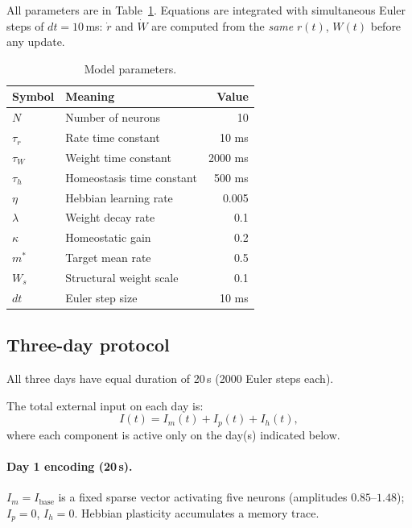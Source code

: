 \documentclass[11pt,a4paper]{article}
\begin{document}
All parameters are in Table~\ref{tab:params}.  Equations are integrated with
simultaneous Euler steps of $dt = 10$\,ms: $\dot{r}$ and $\dot{W}$ are computed
from the \emph{same} $r(t)$, $W(t)$ before any update.

\begin{table}[h]
\centering
\small
\begin{tabular}{llr}
\toprule
Symbol & Meaning & Value \\
\midrule
$N$         & Number of neurons         & 10 \\
$\tau_r$    & Rate time constant        & 10 ms \\
$\tau_W$    & Weight time constant      & 2000 ms \\
$\tau_h$    & Homeostasis time constant & 500 ms \\
$\eta$      & Hebbian learning rate     & 0.005 \\
$\lambda$   & Weight decay rate         & 0.1 \\
$\kappa$    & Homeostatic gain          & 0.2 \\
$m^*$       & Target mean rate          & 0.5 \\
$W_s$       & Structural weight scale   & 0.1 \\
$dt$        & Euler step size           & 10 ms \\
\bottomrule
\end{tabular}
\caption{Model parameters.}
\label{tab:params}
\end{table}

\subsection{Three-day protocol}

All three days have equal duration of 20\,s (2000 Euler steps each).

The total external input on each day is:
\begin{equation}
I(t) = I_m(t) + I_p(t) + I_h(t),
\label{eq:total_input}
\end{equation}
where each component is active only on the day(s) indicated below.

\paragraph{Day 1 \textemdash{} encoding (20\,s).}
$I_m = I_\mathrm{base}$ is a fixed sparse vector activating five neurons
(amplitudes $0.85$--$1.48$); $I_p = 0$, $I_h = 0$.
Hebbian plasticity accumulates a memory trace.
\end{document}
